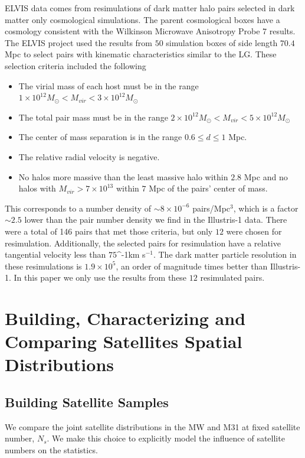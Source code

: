 \documentclass[a4paper,fleqn,usenatbib]{mnras}
\newcommand{\kms}{\ifmmode\mathrm{km\ s}^{-1}\else km s$^{-1}$\fi}
\begin{document}
ELVIS data comes from resimulations of dark matter halo pairs selected
in dark matter only cosmological simulations. 
The parent cosmological boxes have a cosmology consistent with the
Wilkinson Microwave Anisotropy Probe 7 results.
The ELVIS project used the results from $50$ simulation boxes of side
length $70.4$ Mpc to select pairs with kinematic characteristics
similar to the LG. 
These selection criteria included the following
\begin{itemize}
\item The virial mass of each host must be in the range 
$1\times
  10^{12} M_{\odot}< M_{vir}<3\times 10^{12}M_{\odot}$ 
\item The total pair mass must be in the range
$2\times
  10^{12} M_{\odot}< M_{vir}<5\times 10^{12}M_{\odot}$ 
\item The center of mass separation is in the range $0.6\leq d\leq1$
  Mpc.
\item The relative radial velocity is negative.
\item No halos more massive than the least massive halo within $2.8$
  Mpc and no halos with $M_{vir}>7\times 10^{13}$ within $7$ Mpc of
  the pairs' center of mass.
\end{itemize} 

This corresponds to a number density of $\sim 8 \times10^{-6}$
pairs/Mpc$^{3}$, which is a factor $\sim 2.5$ lower than the pair
number density we find in the Illustris-1 data.
There were a total of 146 pairs that met those criteria, but only $12$
were chosen for resimulation. 
Additionally, the selected pairs for resimulation have a relative
tangential velocity less than $75 $\kms. 
The dark matter particle resolution in these resimulations is
$1.9\times 10^5$, an order of magnitude times better than Illustris-1.
In this paper we only use the results from these $12$ resimulated pairs.




\section{Building, Characterizing and Comparing Satellites Spatial Distributions}
\label{sec:SpatialMeasurements}


\subsection{Building Satellite Samples}

We compare the joint satellite distributions in the MW and M31 at fixed
satellite number, $N_s$.
We make this choice to explicitly model the influence of satellite numbers
on the statistics. 
\end{document}
